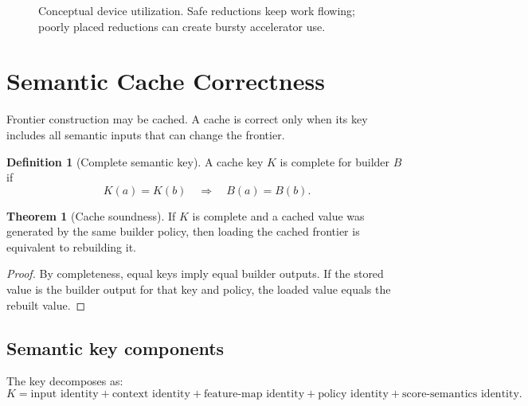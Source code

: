\documentclass[11pt,oneside]{article}
\theoremstyle{definition}
\newtheorem{definition}{Definition}[section]
\newtheorem{theorem}{Theorem}[section]
\begin{document}
\begin{figure}[H]
\centering
{}
\caption{Conceptual device utilization. Safe reductions keep work flowing; poorly placed reductions can create bursty accelerator use.}
\end{figure}

\section{Semantic Cache Correctness}

Frontier construction may be cached. A cache is correct only when its key includes all semantic inputs that can change the frontier.

\begin{definition}[Complete semantic key]
A cache key \(K\) is complete for builder \(B\) if
\[
  K(a)=K(b)
  \quad\Longrightarrow\quad
  B(a)=B(b).
\]
\end{definition}

\begin{theorem}[Cache soundness]
If \(K\) is complete and a cached value was generated by the same builder policy, then loading the cached frontier is equivalent to rebuilding it.
\end{theorem}

\begin{proof}
By completeness, equal keys imply equal builder outputs. If the stored value is the builder output for that key and policy, the loaded value equals the rebuilt value.
\end{proof}

\subsection{Semantic key components}
The key decomposes as:
\[
  K =
  \text{input identity}
  + \text{context identity}
  + \text{feature-map identity}
  + \text{policy identity}
  + \text{score-semantics identity}.
\]
\end{document}
